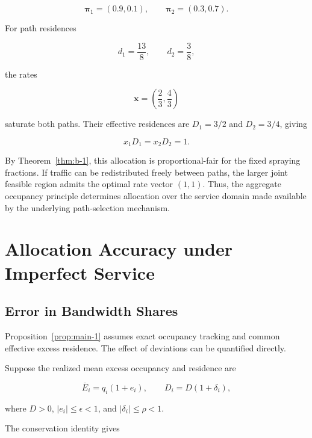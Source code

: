\begin{equation}
\label{eq:app-b-26}
\boldsymbol\pi_1=(0.9,0.1),
\qquad
\boldsymbol\pi_2=(0.3,0.7).
\end{equation}

For path residences

\[
d_1=\frac{13}{8},
\qquad d_2=\frac38,
\]

the rates

\begin{equation}
\label{eq:app-b-27}
\mathbf x=\left(\frac23,\frac43\right)
\end{equation}

saturate both paths. Their effective residences are \(D_1=3/2\) and \(D_2=3/4\), giving

\begin{equation}
\label{eq:app-b-28}
x_1D_1=x_2D_2=1.
\end{equation}

By Theorem~\ref{thm:b-1}, this allocation is proportional-fair for the fixed spraying fractions. If traffic can be redistributed freely between paths, the larger joint feasible region admits the optimal rate vector \((1,1)\). Thus, the aggregate occupancy principle determines allocation over the service domain made available by the underlying path-selection mechanism.


\section{Allocation Accuracy under Imperfect Service}
\label{app:c}

\subsection{Error in Bandwidth Shares}
\label{app:c-1}

Proposition~\ref{prop:main-1} assumes exact occupancy tracking and common effective excess residence. The effect of deviations can be quantified directly.

Suppose the realized mean excess occupancy and residence are

\begin{equation}
\label{eq:app-c-1}
\overline E_i=q_i(1+e_i),
\qquad
D_i=D(1+\delta_i),
\end{equation}

where \(D>0\), \(|e_i|\le\epsilon<1\), and \(|\delta_i|\le\rho<1\).

The conservation identity gives

